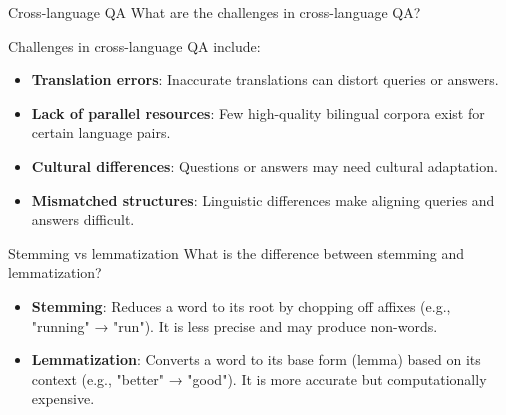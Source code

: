 \documentclass{article}
\begin{document}
\begin{exercise}{Cross-language QA}
  What are the challenges in cross-language QA?

  \begin{solution}
    Challenges in cross-language QA include:
    \begin{itemize}
        \item \textbf{Translation errors}: Inaccurate translations can distort queries or answers.
        \item \textbf{Lack of parallel resources}: Few high-quality bilingual corpora exist for certain language pairs.
        \item \textbf{Cultural differences}: Questions or answers may need cultural adaptation.
        \item \textbf{Mismatched structures}: Linguistic differences make aligning queries and answers difficult.
    \end{itemize}
  \end{solution}
\end{exercise}

\begin{exercise}{Stemming vs lemmatization}
  What is the difference between stemming and lemmatization?

  \begin{solution}
    \begin{itemize}
        \item \textbf{Stemming}: Reduces a word to its root by chopping off affixes (e.g., "running" → "run"). It is less precise and may produce non-words.
        \item \textbf{Lemmatization}: Converts a word to its base form (lemma) based on its context (e.g., "better" → "good"). It is more accurate but computationally expensive.
    \end{itemize}
  \end{solution}
\end{exercise}
\end{document}
